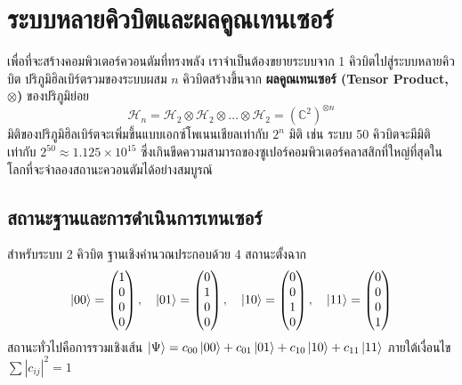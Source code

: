 \section{ระบบหลายคิวบิตและผลคูณเทนเซอร์}

เพื่อที่จะสร้างคอมพิวเตอร์ควอนตัมที่ทรงพลัง เราจำเป็นต้องขยายระบบจาก 1 คิวบิตไปสู่ระบบหลายคิวบิต ปริภูมิฮิลเบิร์ตรวมของระบบผสม $n$ คิวบิตสร้างขึ้นจาก \textbf{ผลคูณเทนเซอร์ (Tensor Product, $\otimes$)} ของปริภูมิย่อย
\begin{equation}
\mathcal{H}_{n} = \mathcal{H}_2 \otimes \mathcal{H}_2 \otimes \dots \otimes \mathcal{H}_2 = (\mathbb{C}^2)^{\otimes n}
\end{equation}
มิติของปริภูมิฮิลเบิร์ตจะเพิ่มขึ้นแบบเอกซ์โพเนนเชียลเท่ากับ $2^n$ มิติ เช่น ระบบ 50 คิวบิตจะมีมิติเท่ากับ $2^{50} \approx 1.125 \times 10^{15}$ ซึ่งเกินขีดความสามารถของซูเปอร์คอมพิวเตอร์คลาสสิกที่ใหญ่ที่สุดในโลกที่จะจำลองสถานะควอนตัมได้อย่างสมบูรณ์

\subsection{สถานะฐานและการดำเนินการเทนเซอร์}
สำหรับระบบ 2 คิวบิต ฐานเชิงคำนวณประกอบด้วย 4 สถานะตั้งฉาก
\begin{equation}
\ket{00} = \begin{pmatrix} 1 \\ 0 \\ 0 \\ 0 \end{pmatrix}, \quad \ket{01} = \begin{pmatrix} 0 \\ 1 \\ 0 \\ 0 \end{pmatrix}, \quad \ket{10} = \begin{pmatrix} 0 \\ 0 \\ 1 \\ 0 \end{pmatrix}, \quad \ket{11} = \begin{pmatrix} 0 \\ 0 \\ 0 \\ 1 \end{pmatrix}
\end{equation}
สถานะทั่วไปคือการรวมเชิงเส้น $\ket{\Psi} = c_{00}\ket{00} + c_{01}\ket{01} + c_{10}\ket{10} + c_{11}\ket{11}$ ภายใต้เงื่อนไข $\sum |c_{ij}|^2 = 1$

